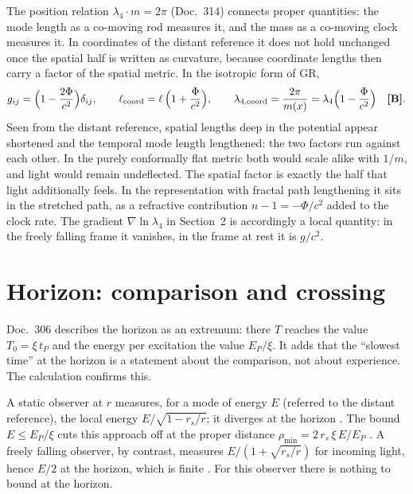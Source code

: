 The position relation $\lambda_4\cdot m=2\pi$ (Doc.~314) connects proper quantities: the mode
length as a co-moving rod measures it, and the mass as a co-moving clock measures it. In
coordinates of the distant reference it does not hold unchanged once the spatial half is written
as curvature, because coordinate lengths then carry a factor of the spatial metric. In the
isotropic form of GR,
\begin{equation}
g_{ij}=\Bigl(1-\frac{2\Phi}{c^2}\Bigr)\delta_{ij},\qquad
\ell_{\text{coord}}=\ell\,\Bigl(1+\frac{\Phi}{c^2}\Bigr),\qquad
\lambda_{4,\text{coord}}=\frac{2\pi}{m(x)}=\lambda_4\Bigl(1-\frac{\Phi}{c^2}\Bigr)\quad\textbf{[B]}.
\end{equation}
Seen from the distant reference, spatial lengths deep in the potential appear shortened and the
temporal mode length lengthened: the two factors run against each other. In the purely
conformally flat metric both would scale alike with $1/m$, and light would remain undeflected.
The spatial factor is exactly the half that light additionally feels. In the representation with
fractal path lengthening it sits in the stretched path, as a refractive contribution
$n-1=-\Phi/c^2$ added to the clock rate. The
gradient $\nabla\ln\lambda_4$ in Section~2 is accordingly a local quantity: in the freely falling
frame it vanishes, in the frame at rest it is $g/c^2$.

\section{Horizon: comparison and crossing}

Doc.~306 describes the horizon as an extremum: there $T$ reaches the value $T_0=\xi\,t_P$ and the
energy per excitation the value $E_P/\xi$. It adds that the ``slowest time'' at the horizon is a
statement about the comparison, not about experience. The calculation confirms this.

A static observer at $r$ measures, for a mode of energy $E$ (referred to the distant reference),
the local energy $E/\sqrt{1-r_s/r}$; it diverges at the horizon \BM. The bound $E\le E_P/\xi$
cuts this approach off at the proper distance $\rho_{\min}=2\,r_s\,\xi\,E/E_P$ \BM. A freely
falling observer, by contrast, measures $E/(1+\sqrt{r_s/r})$ for incoming light, hence $E/2$ at the
horizon, which is finite \BM. For this observer there is nothing to bound at the horizon.

